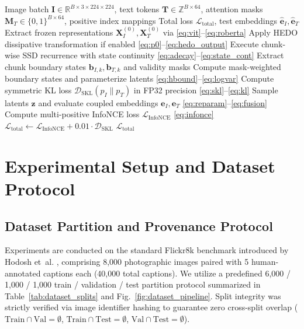 \documentclass[pdflatex,sn-mathphys-num]{sn-jnl}%
\begin{document}
\begin{algorithm}[!htbp]
\caption{HEDO-HVSC Forward Pass and Training Step}
\label{alg:hedo_hvsc}
\begin{algorithmic}[1]
\Require Image batch $\mathbf{I} \in \mathbb{R}^{B \times 3 \times 224 \times 224}$, text tokens $\mathbf{T} \in \mathbb{Z}^{B \times 64}$, attention masks $\mathbf{M}_T \in \{0, 1\}^{B \times 64}$, positive index mappings
\Ensure Total loss $\mathcal{L}_{\text{total}}$, test embeddings $\hat{\mathbf{e}}_I, \hat{\mathbf{e}}_T$
\State Extract frozen representations $\mathbf{X}_I^{(0)}, \mathbf{X}_T^{(0)}$ via \eqref{eq:vit}--\eqref{eq:roberta}
\State Apply HEDO dissipative transformation if enabled \eqref{eq:p0}--\eqref{eq:hedo_output}
\State Execute chunk-wise SSD recurrence with state continuity \eqref{eq:adecay}--\eqref{eq:state_cont}
\State Extract chunk boundary states $\mathbf{b}_{I, k}, \mathbf{b}_{T, k}$ and validity masks
\State Compute mask-weighted boundary states and parameterize latents \eqref{eq:hbound}--\eqref{eq:logvar}
\State Compute symmetric KL loss $\mathcal{D}_{\text{SKL}}(p_I \parallel p_T)$ in FP32 precision \eqref{eq:skl}--\eqref{eq:kl}
\State Sample latents $\mathbf{z}$ and evaluate coupled embeddings $\mathbf{e}_I, \mathbf{e}_T$ \eqref{eq:reparam}--\eqref{eq:fusion}
\State Compute multi-positive InfoNCE loss $\mathcal{L}_{\text{InfoNCE}}$ \eqref{eq:infonce}
\State $\mathcal{L}_{\text{total}} \gets \mathcal{L}_{\text{InfoNCE}} + 0.01 \cdot \mathcal{D}_{\text{SKL}}$
\State \Return $\mathcal{L}_{\text{total}}$
\end{algorithmic}
\end{algorithm}

\section{Experimental Setup and Dataset Protocol}
\label{sec:experimental_setup}

\subsection{Dataset Partition and Provenance Protocol}
Experiments are conducted on the standard Flickr8k benchmark introduced by Hodosh et~al. \cite{hodosh2013framing}, comprising 8,000 photographic images paired with 5 human-annotated captions each (40,000 total captions). We utilize a predefined 6,000 / 1,000 / 1,000 train / validation / test partition protocol summarized in Table~\ref{tab:dataset_splits} and Fig.~\ref{fig:dataset_pipeline}. Split integrity was strictly verified via image identifier hashing to guarantee zero cross-split overlap ($\text{Train} \cap \text{Val} = \emptyset$, $\text{Train} \cap \text{Test} = \emptyset$, $\text{Val} \cap \text{Test} = \emptyset$).
\end{document}
